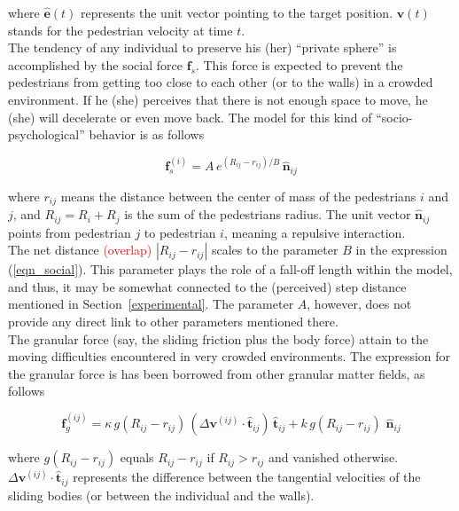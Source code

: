 \documentclass[preprint,12pt]{elsarticle}
\begin{document}
\noindent where $\hat{\mathbf{e}}(t)$ represents the unit vector pointing to 
the target position. $\mathbf{v}(t)$ stands for the pedestrian velocity at time 
$t$. \\

The tendency of any individual to preserve his (her) ``private sphere'' is 
accomplished by the social force $\mathbf{f}_s$. This force is expected to 
prevent the pedestrians from getting too close to each other (or to the walls) 
in a crowded environment. If he (she) perceives that there is not enough space 
to move, he (she) will decelerate or even move back. The model for this kind of 
``socio-psychological'' behavior is as follows

\begin{equation}
 \mathbf{f}_s^{(i)}=A\,e^{(R_{ij}-r_{ij})/B}\,\hat{\mathbf{n}}_{ij}
 \label{eqn_social}
\end{equation}

\noindent where $r_{ij}$ means the distance between the center of mass of the 
pedestrians $i$ and $j$, and $R_{ij}=R_i+R_j$ is the sum of the pedestrians 
radius. The unit vector $\hat{\mathbf{n}}_{ij}$ points from pedestrian $j$ to 
pedestrian $i$, meaning a repulsive interaction.\\ 

The net distance \textcolor{red}{(overlap)} $|R_{ij}-r_{ij}|$ scales to the parameter $B$ in the 
expression (\ref{eqn_social}). This parameter plays the role of a fall-off 
length within the model, and thus, it may be somewhat connected to the 
(perceived) step distance mentioned in Section~\ref{experimental}. The 
parameter $A$, however, does not provide any direct link to other parameters 
mentioned there. \\    

The granular force (say, the sliding friction plus the body force) attain to 
the moving difficulties encountered in very crowded environments. The 
expression for the granular force is has been borrowed from other granular 
matter fields, as follows

\begin{equation}
 \mathbf{f}_g^{(ij)}=\kappa\,g(R_{ij}-r_{ij})\,
(\Delta\mathbf{v}^{(ij)}\cdot\hat{\mathbf{t}}_{ij})\,\hat{\mathbf{t}}_{ij}+
k\,g(R_{ij}-r_{ij})\,
\,\hat{\mathbf{n}}_{ij}\label{eqn_friction}
\end{equation}

\noindent where $g(R_{ij}-r_{ij})$ equals $R_{ij}-r_{ij}$ if $R_{ij}>r_{ij}$ and 
vanished otherwise. $\Delta\mathbf{v}^{(ij)}\cdot\hat{\mathbf{t}}_{ij}$ 
represents the difference between the tangential velocities of the sliding 
bodies (or between the individual and the walls).    \\
\end{document}
